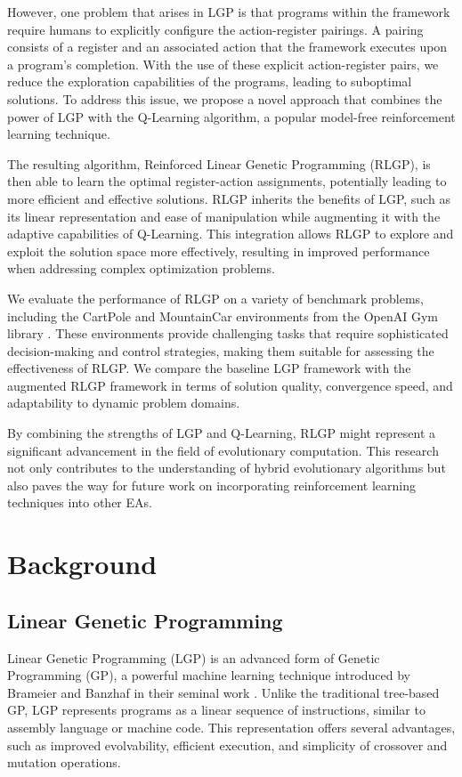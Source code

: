\documentclass[12pt, final]{dalcsthesis}
\begin{document}
However, one problem that arises in LGP is that programs within the framework require humans to explicitly configure the action-register pairings. A pairing consists of a register and an associated action that the framework executes upon a program's completion. With the use of these explicit action-register pairs, we reduce the exploration capabilities of the programs, leading to suboptimal solutions. To address this issue, we propose a novel approach that combines the power of LGP with the Q-Learning algorithm, a popular model-free reinforcement learning technique.

The resulting algorithm, Reinforced Linear Genetic Programming (RLGP), is then able to learn the optimal register-action assignments, potentially leading to more efficient and effective solutions. RLGP inherits the benefits of LGP, such as its linear representation and ease of manipulation while augmenting it with the adaptive capabilities of Q-Learning. This integration allows RLGP to explore and exploit the solution space more effectively, resulting in improved performance when addressing complex optimization problems.

We evaluate the performance of RLGP on a variety of benchmark problems, including the CartPole and MountainCar environments from the OpenAI Gym library \cite{1606.01540}. These environments provide challenging tasks that require sophisticated decision-making and control strategies, making them suitable for assessing the effectiveness of RLGP. We compare the baseline LGP framework with the augmented RLGP framework in terms of solution quality, convergence speed, and adaptability to dynamic problem domains.

By combining the strengths of LGP and Q-Learning, RLGP might represent a significant advancement in the field of evolutionary computation. This research not only contributes to the understanding of hybrid evolutionary algorithms but also paves the way for future work on incorporating reinforcement learning techniques into other EAs.

\chapter{Background}
\section{Linear Genetic Programming}
Linear Genetic Programming (LGP) is an advanced form of Genetic Programming (GP), a powerful machine learning technique introduced by Brameier and Banzhaf in their seminal work \cite{brameier2001comparison}. Unlike the traditional tree-based GP, LGP represents programs as a linear sequence of instructions, similar to assembly language or machine code. This representation offers several advantages, such as improved evolvability, efficient execution, and simplicity of crossover and mutation operations.
\end{document}
